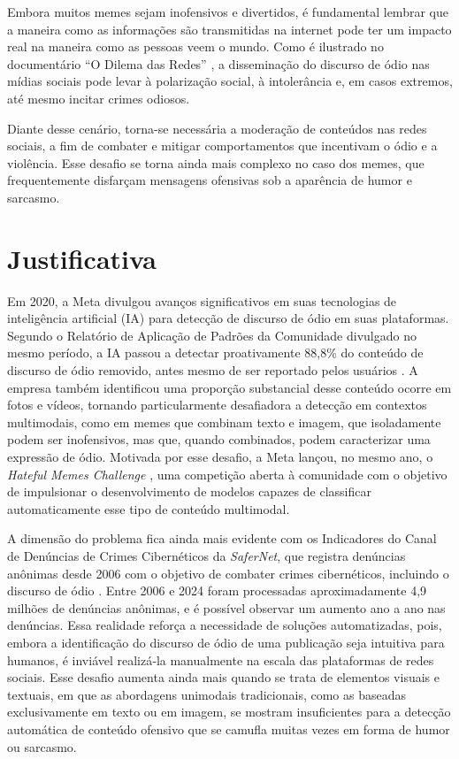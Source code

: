 Embora muitos memes sejam inofensivos e divertidos, é fundamental lembrar que a maneira como as informações são transmitidas na internet pode ter um impacto real na maneira como as pessoas veem o mundo. Como é ilustrado no documentário “O Dilema das Redes” \cite{SocialDilemma2020}, a disseminação do discurso de ódio nas mídias sociais pode levar à polarização social, à intolerância e, em casos extremos, até mesmo incitar crimes odiosos. 

Diante desse cenário, torna-se necessária a moderação de conteúdos nas redes sociais, a fim de combater e mitigar comportamentos que incentivam o ódio e a violência. Esse desafio se torna ainda mais complexo no caso dos memes, que frequentemente disfarçam mensagens ofensivas sob a aparência de humor e sarcasmo.

\section{Justificativa}

Em 2020, a Meta divulgou avanços significativos em suas tecnologias de inteligência artificial (IA) para detecção de discurso de ódio em suas plataformas. Segundo o Relatório de Aplicação de Padrões da Comunidade divulgado no mesmo período, a IA passou a detectar proativamente 88,8\% do conteúdo de discurso de ódio removido, antes mesmo de ser reportado pelos usuários \cite{MetaAIAdvances2020}. A empresa também identificou uma proporção substancial desse conteúdo ocorre em fotos e vídeos, tornando particularmente desafiadora a detecção em contextos multimodais, como em memes que combinam texto e imagem, que isoladamente podem ser inofensivos, mas que, quando combinados, podem caracterizar uma expressão de ódio. Motivada por esse desafio, a Meta lançou, no mesmo ano, o \textit{Hateful Memes Challenge} \cite{ArticleHatefulMemesChallenge2020}, uma competição aberta à comunidade com o objetivo de impulsionar o desenvolvimento de modelos capazes de classificar automaticamente esse tipo de conteúdo multimodal.

A dimensão do problema fica ainda mais evidente com os Indicadores do Canal de Denúncias de Crimes Cibernéticos da \textit{SaferNet}, que registra denúncias anônimas desde 2006 com o objetivo de combater crimes cibernéticos, incluindo o discurso de ódio \cite{Safernet}. Entre 2006 e 2024 foram processadas aproximadamente 4,9 milhões de denúncias anônimas, e é possível observar um aumento ano a ano nas denúncias. Essa realidade reforça a necessidade de soluções automatizadas, pois, embora a identificação do discurso de ódio de uma publicação seja intuitiva para humanos, é inviável realizá‑la manualmente na escala das plataformas de redes sociais. Esse desafio aumenta ainda mais quando se trata de elementos visuais e textuais, em que as abordagens unimodais tradicionais, como as baseadas exclusivamente em texto ou em imagem, se mostram insuficientes para a detecção automática de conteúdo ofensivo que se camufla muitas vezes em forma de humor ou sarcasmo.

